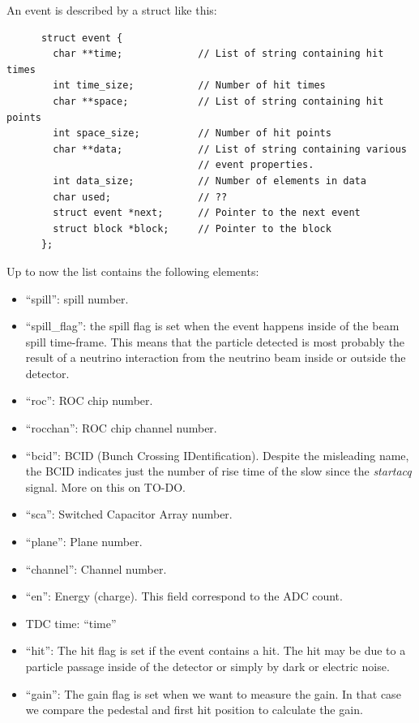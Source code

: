 An event is described by a struct like this:
\begin{lstlisting}
      struct event {
        char **time;             // List of string containing hit times
        int time_size;           // Number of hit times
        char **space;            // List of string containing hit points
        int space_size;          // Number of hit points
        char **data;             // List of string containing various
                                 // event properties.
        int data_size;           // Number of elements in data
        char used;               // ??
        struct event *next;      // Pointer to the next event
        struct block *block;     // Pointer to the block
      };
\end{lstlisting}
Up to now the  list contains the following elements:
\begin{itemize}
\item ``spill'': spill number.
\item ``spill\_flag'': the spill flag is set when the event happens
  inside of the beam spill time-frame. This means that the particle
  detected is most probably the result of a neutrino interaction from
  the neutrino beam inside or outside the detector.
\item ``roc'': ROC chip number.
\item ``rocchan'': ROC chip channel number.
\item ``bcid'': BCID (Bunch Crossing IDentification). Despite the
  misleading name, the BCID indicates just the number of rise time of
  the slow since the \textit{startacq} signal. More on this on TO-DO.
\item ``sca'': Switched Capacitor Array number.
\item ``plane'': Plane number.
\item ``channel'': Channel number.
\item ``en'': Energy (charge). This field correspond to the ADC count.
\item TDC time: ``time''
\item ``hit'': The hit flag is set if the event contains a hit. The
  hit may be due to a particle passage inside of the detector or
  simply by dark or electric noise.
\item ``gain'': The gain flag is set when we want to measure the
  gain. In that case we compare the pedestal and first hit position to
  calculate the gain.
\end{itemize}

